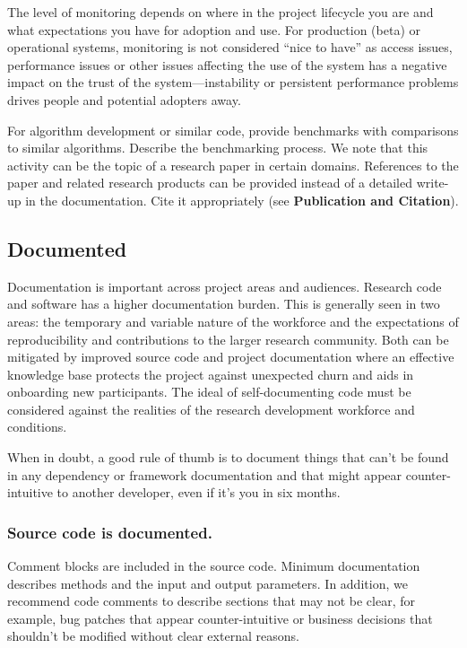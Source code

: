 \documentclass{article}
\newcounter{subsubsubsection}[subsubsection]
\begin{document}
The level of monitoring depends on where in the project lifecycle you are and what expectations you have for adoption and use. For production (beta) or operational systems, monitoring is not considered “nice to have” as access issues, performance issues or other issues affecting the use of the system has a negative impact on the trust of the system—instability or persistent performance problems \autocite{brutlag_speed_2009} drives people and potential adopters away.

For algorithm development or similar code, provide benchmarks with comparisons to similar algorithms. Describe the benchmarking process. We note that this activity can be the topic of a research paper in certain domains. References to the paper and related research products can be provided instead of a detailed write-up in the documentation. Cite it appropriately (see \textbf{Publication and Citation}).


\subsection{Documented}
Documentation is important across project areas and audiences. Research code and software has a higher documentation burden. This is generally seen in two areas: the temporary and variable nature of the workforce and the expectations of reproducibility and contributions to the larger research community. Both can be mitigated by improved source code and project documentation where an effective knowledge base protects the project against unexpected churn and aids in onboarding new participants. The ideal of self-documenting code must be considered against the realities of the research development workforce and conditions.
 
When in doubt, a good rule of thumb is to document things that can’t be found in any dependency or framework documentation and that might appear counter-intuitive to another developer, even if it’s you in six months. 

\subsubsection{Source code is documented.}
Comment blocks are included in the source code. Minimum documentation describes methods and the input and output parameters. In addition, we recommend code comments to describe sections that may not be clear, for example, bug patches that appear counter-intuitive or business decisions that shouldn’t be modified without clear external reasons. 
 
\end{document}
